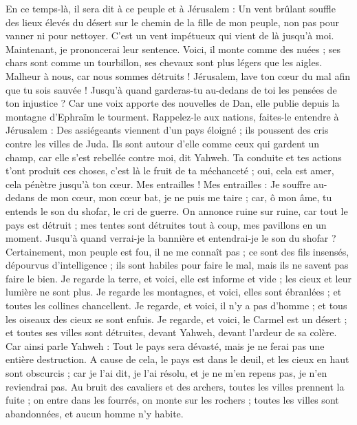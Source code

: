 \begin{multicols}{2}
En ce temps-là, il sera dit à ce peuple et à Jérusalem : Un vent brûlant souffle des lieux élevés du désert sur le chemin de la fille de mon peuple, non pas pour vanner ni pour nettoyer.
C’est un vent impétueux qui vient de là jusqu’à moi. Maintenant, je prononcerai leur sentence.
Voici, il monte comme des nuées ; ses chars sont comme un tourbillon, ses chevaux sont plus légers que les aigles. Malheur à nous, car nous sommes détruits !
Jérusalem, lave ton cœur du mal afin que tu sois sauvée ! Jusqu’à quand garderas-tu au-dedans de toi les pensées de ton injustice ?
Car une voix apporte des nouvelles de Dan, elle publie depuis la montagne d'Ephraïm le tourment.
Rappelez-le aux nations, faites-le entendre à Jérusalem : Des assiégeants viennent d'un pays éloigné ; ils poussent des cris contre les villes de Juda.
Ils sont autour d'elle comme ceux qui gardent un champ, car elle s’est rebellée contre moi, dit Yahweh.
Ta conduite et tes actions t'ont produit ces choses, c’est là le fruit de ta méchanceté ; oui, cela est amer, cela pénètre jusqu’à ton cœur.
Mes entrailles ! Mes entrailles : Je souffre au-dedans de mon cœur, mon cœur bat, je ne puis me taire ; car, ô mon âme, tu entends le son du shofar, le cri de guerre.
On annonce ruine sur ruine, car tout le pays est détruit ; mes tentes sont détruites tout à coup, mes pavillons en un moment.
Jusqu’à quand verrai-je la bannière et entendrai-je le son du shofar ?
Certainement, mon peuple est fou, il ne me connaît pas ; ce sont des fils insensés, dépourvus d’intelligence ; ils sont habiles pour faire le mal, mais ils ne savent pas faire le bien.
Je regarde la terre, et voici, elle est informe et vide ; les cieux et leur lumière ne sont plus.
Je regarde les montagnes, et voici, elles sont ébranlées ; et toutes les collines chancellent.
Je regarde, et voici, il n'y a pas d’homme ; et tous les oiseaux des cieux se sont enfuis.
Je regarde, et voici, le Carmel est un désert ; et toutes ses villes sont détruites, devant Yahweh, devant l'ardeur de sa colère.
Car ainsi parle Yahweh : Tout le pays sera dévasté, mais je ne ferai pas une entière destruction.
A cause de cela, le pays est dans le deuil, et les cieux en haut sont obscurcis ; car je l'ai dit, je l'ai résolu, et je ne m'en repens pas, je n’en reviendrai pas.
Au bruit des cavaliers et des archers, toutes les villes prennent la fuite ; on entre dans les fourrés, on monte sur les rochers ; toutes les villes sont abandonnées, et aucun homme n’y habite.

\end{multicols}
